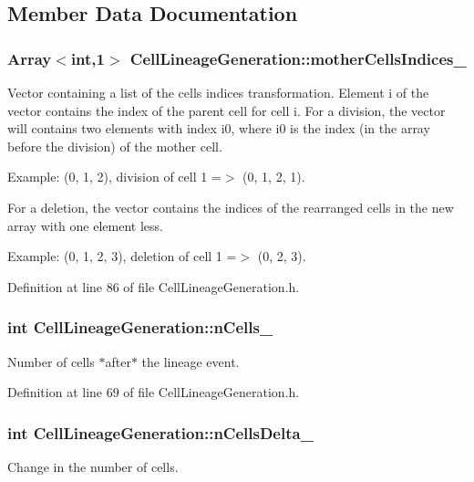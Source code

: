\subsection{\-Member \-Data \-Documentation}
\hypertarget{class_cell_lineage_generation_aea150bc5abc381a0a7df890ece98543f}{
\subsubsection[{mother\-Cells\-Indices\-\_\-}]{\setlength{\rightskip}{0pt plus 5cm}\-Array$<$int,1$>$ {\bf \-Cell\-Lineage\-Generation\-::mother\-Cells\-Indices\-\_\-}}}\label{class_cell_lineage_generation_aea150bc5abc381a0a7df890ece98543f}
\-Vector containing a list of the cells indices transformation. \-Element i of the vector contains the index of the parent cell for cell i. \-For a division, the vector will contains two elements with index i0, where i0 is the index (in the array before the division) of the mother cell.

\-Example\-: (0, 1, 2), division of cell 1 =$>$ (0, 1, 2, 1).

\-For a deletion, the vector contains the indices of the rearranged cells in the new array with one element less.

\-Example\-: (0, 1, 2, 3), deletion of cell 1 =$>$ (0, 2, 3). 

\-Definition at line 86 of file \-Cell\-Lineage\-Generation.\-h.

\hypertarget{class_cell_lineage_generation_a5ba370d3f6492d43ceeb2f73e7a2c47a}{
\subsubsection[{n\-Cells\-\_\-}]{\setlength{\rightskip}{0pt plus 5cm}int {\bf \-Cell\-Lineage\-Generation\-::n\-Cells\-\_\-}}}\label{class_cell_lineage_generation_a5ba370d3f6492d43ceeb2f73e7a2c47a}
\-Number of cells $\ast$after$\ast$ the lineage event. 

\-Definition at line 69 of file \-Cell\-Lineage\-Generation.\-h.

\hypertarget{class_cell_lineage_generation_a046245349fd814cd7b5fc57d2a9d3fff}{
\subsubsection[{n\-Cells\-Delta\-\_\-}]{\setlength{\rightskip}{0pt plus 5cm}int {\bf \-Cell\-Lineage\-Generation\-::n\-Cells\-Delta\-\_\-}}}\label{class_cell_lineage_generation_a046245349fd814cd7b5fc57d2a9d3fff}
\-Change in the number of cells. 


